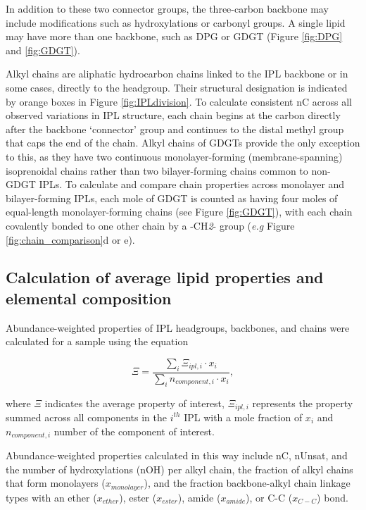 In addition to these two connector groups, the three-carbon backbone may include modifications such as hydroxylations or carbonyl groups. A single lipid may have more than one backbone, such as DPG or GDGT (Figure \ref{fig:DPG} and \ref{fig:GDGT}). 

Alkyl chains are aliphatic hydrocarbon chains linked to the IPL backbone or in some cases, directly to the headgroup. Their structural designation is indicated by orange boxes in Figure \ref{fig:IPLdivision}. To calculate consistent nC across all observed variations in IPL structure, each chain begins at the carbon directly after the backbone `connector' group and continues to the distal methyl group that caps the end of the chain. Alkyl chains of GDGTs provide the only exception to this, as they have two continuous monolayer-forming (membrane-spanning) isoprenoidal chains rather than two bilayer-forming chains common to non-GDGT IPLs. To calculate and compare chain properties across monolayer and bilayer-forming IPLs, each mole of GDGT is counted as having four moles of equal-length monolayer-forming chains (see Figure \ref{fig:GDGT}), with each chain covalently bonded to one other chain by a -CH\textit{2}- group (\textit{e.g} Figure \ref{fig:chain_comparison}d or e).





\subsection{Calculation of average lipid properties and elemental composition}
Abundance-weighted properties of IPL headgroups, backbones, and chains were calculated for a sample using the equation

\begin{equation} \label{eq:avecomponent}
\Xi = \frac{\sum_{i} \Xi_{ipl,i} \cdot x_{i}}{\sum_{i} n_{component,i} \cdot x_{i}},
\end{equation}

\noindent where $\Xi$ indicates the average property of interest, $\Xi_{ipl,i}$ represents the property summed across all components in the $i^{th}$ IPL with a mole fraction of $x_{i}$ and $n_{component,i}$ number of the component of interest.

Abundance-weighted properties calculated in this way include nC, nUnsat, and the number of hydroxylations (nOH) per alkyl chain, the fraction of alkyl chains that form monolayers ($x_{monolayer}$), and the fraction backbone-alkyl chain linkage types with an ether ($x_{ether}$), ester ($x_{ester}$), amide ($x_{amide}$), or C-C ($x_{C-C}$) bond.

